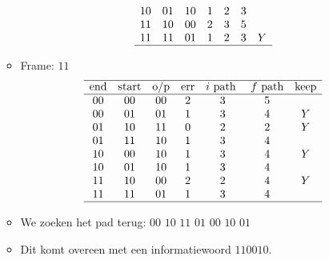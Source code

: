 \documentclass[main.tex]{subfiles}
\begin{document}
\begin{itemize}
\begin{itemize}
\[\begin{array}{ccccccc}
      10 & 01 & 10 & 1 & 2 & 3 & \\
      11 & 10 & 00 & 2 & 3 & 5 & \\
      11 & 11 & 01 & 1 & 2 & 3 & Y\\
      \hline
    \end{array}
    \]
  \item Frame: $11$
    \[
    \begin{array}{ccccccc}
      \hline
      \text{end} & \text{start} & \text{o/p} & \text{err} & i \text{ path } & f \text{ path} & \text{keep}\\
      \hline
      00 & 00 & 00 & 2 & 3 & 5 & \\
      00 & 01 & 01 & 1 & 3 & 4 & Y\\
      01 & 10 & 11 & 0 & 2 & 2 & Y\\
      01 & 11 & 10 & 1 & 3 & 4 & \\
      10 & 00 & 10 & 1 & 3 & 4 & Y\\
      10 & 01 & 10 & 1 & 3 & 4 & \\
      11 & 10 & 00 & 2 & 2 & 4 & Y\\
      11 & 11 & 01 & 1 & 3 & 4 & \\
      \hline
    \end{array}
    \]
  \item We zoeken het pad terug: $00$ $10$ $11$ $01$ $00$ $10$ $01$
  \item Dit komt overeen met een informatiewoord $110010$.
  \end{itemize}
\end{itemize}
\end{document}
